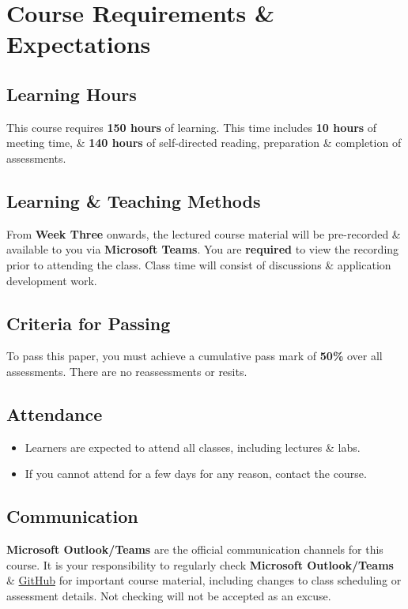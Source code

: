\documentclass{article}
\begin{document}
\section*{Course Requirements \& Expectations}

\subsection*{Learning Hours}
This course requires \textbf{150 hours} of learning. This time includes \textbf{10 hours} of meeting time, \& \textbf{140 hours} of self-directed reading, preparation \& completion of assessments.

\subsection*{Learning \& Teaching Methods}
From \textbf{Week Three} onwards, the lectured course material will be pre-recorded \& available to you via \textbf{Microsoft Teams}. You are \textbf{required} to view the recording prior to attending the class. Class time will consist of discussions \& application development work.  

\subsection*{Criteria for Passing}
To pass this paper, you must achieve a cumulative pass mark of \textbf{50\%} over all assessments. There are no reassessments or resits.

\subsection*{Attendance}
\begin{itemize}
	\item Learners are expected to attend all classes, including lectures \& labs.
	\item If you cannot attend for a few days for any reason, contact the course.
\end{itemize}

\subsection*{Communication}
\textbf{Microsoft Outlook/Teams} are the official communication channels for this course. It is your responsibility to regularly check \textbf{Microsoft Outlook/Teams} \& \href{https://github.com/otago-polytechnic-bit-courses/ID721001-mobile-application-development}{GitHub} for important course material, including changes to class scheduling or assessment details. Not checking will not be accepted as an excuse.
\end{document}
